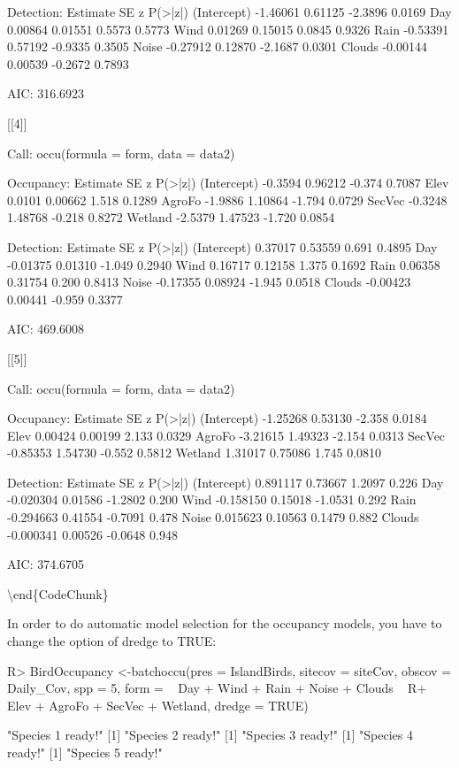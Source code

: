 \documentclass[article]{jss}
\begin{document}
\begin{CodeOutput}
Detection:
            Estimate      SE       z P(>|z|)
(Intercept) -1.46061 0.61125 -2.3896  0.0169
Day          0.00864 0.01551  0.5573  0.5773
Wind         0.01269 0.15015  0.0845  0.9326
Rain        -0.53391 0.57192 -0.9335  0.3505
Noise       -0.27912 0.12870 -2.1687  0.0301
Clouds      -0.00144 0.00539 -0.2672  0.7893

AIC: 316.6923 

[[4]]

Call:
occu(formula = form, data = data2)

Occupancy:
            Estimate      SE      z P(>|z|)
(Intercept)  -0.3594 0.96212 -0.374  0.7087
Elev          0.0101 0.00662  1.518  0.1289
AgroFo       -1.9886 1.10864 -1.794  0.0729
SecVec       -0.3248 1.48768 -0.218  0.8272
Wetland      -2.5379 1.47523 -1.720  0.0854

Detection:
            Estimate      SE      z P(>|z|)
(Intercept)  0.37017 0.53559  0.691  0.4895
Day         -0.01375 0.01310 -1.049  0.2940
Wind         0.16717 0.12158  1.375  0.1692
Rain         0.06358 0.31754  0.200  0.8413
Noise       -0.17355 0.08924 -1.945  0.0518
Clouds      -0.00423 0.00441 -0.959  0.3377

AIC: 469.6008 

[[5]]

Call:
occu(formula = form, data = data2)

Occupancy:
            Estimate      SE      z P(>|z|)
(Intercept) -1.25268 0.53130 -2.358  0.0184
Elev         0.00424 0.00199  2.133  0.0329
AgroFo      -3.21615 1.49323 -2.154  0.0313
SecVec      -0.85353 1.54730 -0.552  0.5812
Wetland      1.31017 0.75086  1.745  0.0810

Detection:
             Estimate      SE       z P(>|z|)
(Intercept)  0.891117 0.73667  1.2097   0.226
Day         -0.020304 0.01586 -1.2802   0.200
Wind        -0.158150 0.15018 -1.0531   0.292
Rain        -0.294663 0.41554 -0.7091   0.478
Noise        0.015623 0.10563  0.1479   0.882
Clouds      -0.000341 0.00526 -0.0648   0.948

AIC: 374.6705 
\end{CodeOutput}

\textbackslash{}end\{CodeChunk\}

In order to do automatic model selection for the occupancy models, you
have to change the option of dredge to TRUE:

\begin{CodeChunk}

\begin{CodeInput}
R> BirdOccupancy <-batchoccu(pres = IslandBirds, sitecov = siteCov, obscov = Daily_Cov, spp =  5, form = ~ Day + Wind + Rain + Noise + Clouds ~
R+ Elev + AgroFo + SecVec + Wetland, dredge = TRUE)
\end{CodeInput}

\begin{CodeOutput}
[1] "Species 1 ready!"
[1] "Species 2 ready!"
[1] "Species 3 ready!"
[1] "Species 4 ready!"
[1] "Species 5 ready!"
\end{CodeOutput}
\end{CodeChunk}
\end{document}
